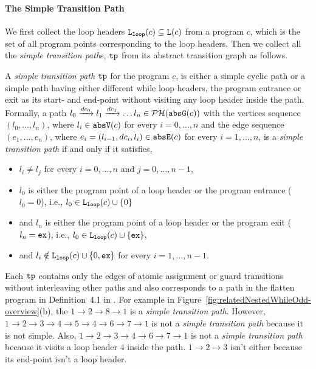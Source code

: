 \paragraph{The Simple Transition Path}
We first collect the loop headers $\mathtt{L}_{\mathtt{loop}}(c) \subseteq \mathtt{L}(c)$ from a program $c$, which is the set of all program points corresponding to the loop headers.
Then we collect all the \emph{simple transition path}s, $\mathtt{tp}$ from its abstract transition graph as follows.
\begin{defn}
  \label{def:tpath}
A \emph{simple transition path}
$\mathtt{tp}$ for the program $c$, is either a simple cyclic path
or a simple path having either different while loop headers, the program entrance or exit as its start- and end-point
without visiting any loop header inside the path.
\\
Formally, a path $l_0 \xrightarrow{dc_0} l_1 \xrightarrow{dc_1} \ldots l_n \in \mathcal{PH}(\mathtt{abs}{\mathtt{G}}(c))$ with the
vertices sequence $(l_0, \ldots, l_n)$, where $l_i \in \mathtt{abs}{\mathtt{V}}(c)$ for every $i = 0, \ldots, n$ and
%
the edge sequence $(e_1, \ldots, e_n)$, where $e_i = (l_{i - 1}, dc_i, l_{i}) \in \mathtt{abs}{\mathtt{E}}(c)$ for every $i = 1, \ldots, n$,
%
is a \emph{simple transition path} if and only if it satisfies,
\begin{itemize}
  \item $l_i \neq l_j$ for every $i = 0, \ldots, n$ and $j = 0, \ldots, {n - 1}$,
  \item $l_0$ is either the program point of a loop header or the program entrance ($l_0 = 0$),
  i.e., $l_0 \in \mathtt{L}_{\mathtt{loop}}(c) \cup \{ 0 \}$
  \item and $l_n$ is either the program point of a loop header or the program exit ($l_n = \mathtt{ex}$),
  i.e., $l_0 \in \mathtt{L}_{\mathtt{loop}}(c) \cup \{ \mathtt{ex} \}$,
  \item and $l_i \notin \mathtt{L}_{\mathtt{loop}}(c) \cup \{ 0, \mathtt{ex} \}$ for every $i = 1, \ldots, n-1$.
\end{itemize}
\end{defn}
Each $\mathtt{tp}$ 
contains only the edges of atomic assignment or guard transitions without interleaving other paths and also corresponds to a path in the flatten program in Definition~4.1 in \cite{GulwaniJK09}.
For example in Figure~\ref{fig:relatedNestedWhileOdd-overview}(b), the $1 \to 2 \to 8 \to 1$ is a \emph{simple transition path}.
However, $1 \to 2 \to 3 \to 4 \to 5 \to 4 \to 6 \to 7 \to 1$ is not a \emph{simple transition path} because it is not simple.
Also, $1 \to 2 \to 3 \to 4 \to 6 \to 7 \to 1$ is not a \emph{simple transition path} because it visits a loop header $4$ inside the path. $1 \to 2 \to 3$ isn't either because its end-point isn't a loop header.

